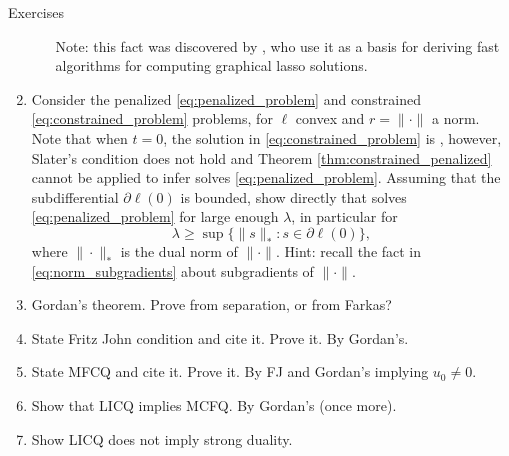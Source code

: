 \begin{xcb}{Exercises}
\begin{enumerate}[label=\thechapter.\arabic*]
\begin{enumerate}[label=\alph*.]
  \smallskip 
  Note: this fact was discovered by \cite{witten2011new, mazumder2012exact}, who
  use it as a basis for deriving fast algorithms for computing graphical lasso
  solutions.     
\end{enumerate}

\item \label{ex:penalized_limit}
  Consider the penalized \eqref{eq:penalized_problem} and constrained
  \eqref{eq:constrained_problem} problems, for $\ell$ convex and $r =
  \|\cdot\|$ a norm. Note that when $t = 0$, the solution in
  \eqref{eq:constrained_problem} is , however, Slater's
  condition does not hold and Theorem \ref{thm:constrained_penalized} cannot be
  applied to infer  solves
  \eqref{eq:penalized_problem}. Assuming that the subdifferential $\partial
  \ell(0)$ is bounded, show directly that  solves
  \eqref{eq:penalized_problem} for large enough $\lambda$, in particular for 
  \[
  \lambda \geq \sup \{ \|s\|_* : s \in \partial \ell(0) \},
  \]
  where $\|\cdot\|_*$ is the dual norm of $\|\cdot\|$. Hint: recall the fact in 
  \eqref{eq:norm_subgradients} about subgradients of $\|\cdot\|$.

\item Gordan's theorem. Prove from separation, or from Farkas? 

\item \label{ex:fritz_john_condition} 
  State Fritz John condition and cite it. Prove it. By Gordan's. 

\item \label{ex:mfcq} 
  State MFCQ and cite it. Prove it. By FJ and Gordan's implying $u_0 \not=
  0$. 

\item \label{ex:licq_implies_mfcq}
  Show that LICQ implies MCFQ. By Gordan's (once more). 

\item Show LICQ does not imply strong duality. 


\end{enumerate}
\end{xcb}
